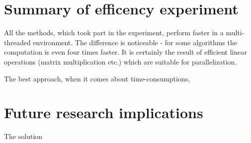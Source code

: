 \section{Summary of efficency experiment}

All the methods, which took part in the experiment, perform faster in a multi-threaded environment. The difference is noticeable - for some algorithms the computation is even four times faster. It is certainly the result of efficient linear operations (matrix multiplication etc.) which are suitable for parallelization.

The best approach, when it comes about time-consumptions, 

\section{Future research implications}

The solution 
